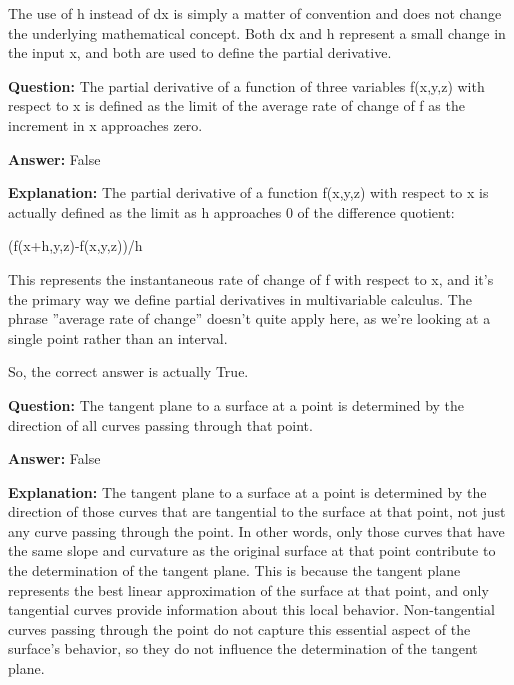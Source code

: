 \documentclass{article}
\begin{document}
The use of h instead of dx is simply a matter of convention and does not change the underlying mathematical concept. Both dx and h represent a small change in the input x, and both are used to define the partial derivative.
                
                \vspace{0.5cm} 
        
            
                \textbf {Question:} The partial derivative of a function of three variables f(x,y,z) with respect to x is defined as the limit of the average rate of change of f as the increment in x approaches zero.
                
                \textbf{Answer:} False

                \textbf{Explanation:} The partial derivative of a function f(x,y,z) with respect to x is actually defined as the limit as h approaches 0 of the difference quotient:

(f(x+h,y,z)-f(x,y,z))/h

This represents the instantaneous rate of change of f with respect to x, and it's the primary way we define partial derivatives in multivariable calculus. The phrase ''average rate of change'' doesn't quite apply here, as we're looking at a single point rather than an interval.

So, the correct answer is actually True.
                
                \vspace{0.5cm} 
        
            
                \textbf {Question:} The tangent plane to a surface at a point is determined by the direction of all curves passing through that point.
                
                \textbf{Answer:} False

                \textbf{Explanation:} The tangent plane to a surface at a point is determined by the direction of those curves that are tangential to the surface at that point, not just any curve passing through the point. In other words, only those curves that have the same slope and curvature as the original surface at that point contribute to the determination of the tangent plane. This is because the tangent plane represents the best linear approximation of the surface at that point, and only tangential curves provide information about this local behavior. Non-tangential curves passing through the point do not capture this essential aspect of the surface's behavior, so they do not influence the determination of the tangent plane.
                
\end{document}
